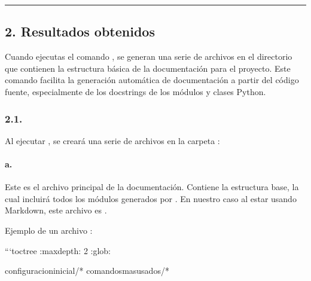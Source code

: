 \documentclass[a4paper,10pt,oneside,spanish,openany]{sphinxmanual}
\begin{document}
\bigskip\hrule\bigskip



\subsection{2. Resultados obtenidos}
\label{\detokenize{configuracion_inicial/007.Creacion_de_ficheros_de_codigo_y_generacion_automatica_de_documentacion:resultados-obtenidos}}
\sphinxAtStartPar
Cuando ejecutas el comando , se generan una serie de archivos en el directorio  que contienen la estructura básica de la documentación para el proyecto. Este comando facilita la generación automática de documentación a partir del código fuente, especialmente de los docstrings de los módulos y clases Python.


\subsubsection{2.1. }
\label{\detokenize{configuracion_inicial/007.Creacion_de_ficheros_de_codigo_y_generacion_automatica_de_documentacion:estructura-de-archivos-generada}}
\sphinxAtStartPar
Al ejecutar , se creará una serie de archivos en la carpeta :


\paragraph{a. }
\label{\detokenize{configuracion_inicial/007.Creacion_de_ficheros_de_codigo_y_generacion_automatica_de_documentacion:a-index-rst-o-index-md}}
\sphinxAtStartPar
Este es el archivo principal de la documentación. Contiene la estructura base, la cual incluirá todos los módulos generados por . En nuestro caso al estar usando Markdown, este archivo es .

\sphinxAtStartPar
Ejemplo de un archivo :

\begin{sphinxVerbatim}[commandchars=\\\{\}]


```\PYGZob{}toctree\PYGZcb{}
:maxdepth: 2
:glob:

configuracion\PYGZus{}inicial/*
comandos\PYGZus{}mas\PYGZus{}usados/*
\end{sphinxVerbatim}
\end{document}
